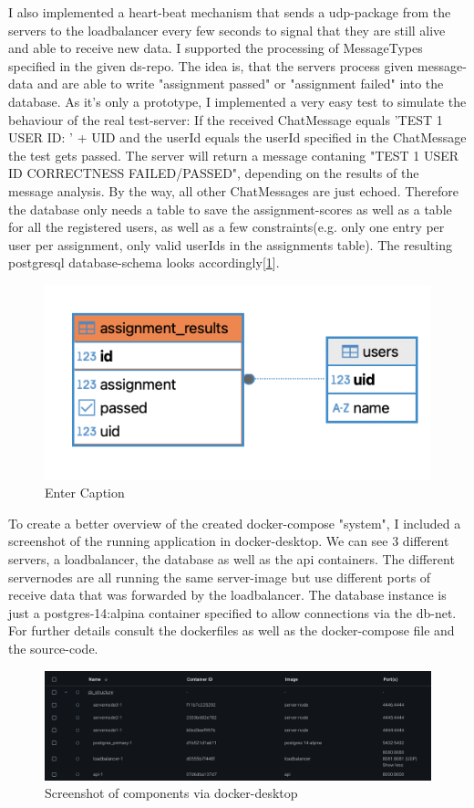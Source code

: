 \documentclass{article}
\begin{document}
I also implemented  a heart-beat mechanism that sends a udp-package from the servers to the loadbalancer every few seconds to signal that they are still alive and able to receive new data. 
I supported the processing of MessageTypes specified in the given ds-repo. 
The idea is, that the servers process given message-data and are able to write "assignment passed" or "assignment failed" into the database.
As it's only a prototype, I implemented a very easy test to simulate the behaviour of the real test-server:
If the received ChatMessage equals 'TEST 1 USER ID: ' + UID and the userId equals the userId specified in the ChatMessage the test gets passed. The server will return a message contaning "TEST 1 USER ID CORRECTNESS FAILED/PASSED", depending on the results of the message analysis. By the way, all other ChatMessages are just echoed.
Therefore the database only needs a table to save the assignment-scores as well as a table for all the registered users, as well as a few constraints(e.g. only one entry per user per assignment, only valid userIds in the assignments table).
The resulting postgresql database-schema looks accordingly[\ref{fig:database_assignment}].

\begin{figure}[!hb]
    \centering
    \includegraphics[width=0.5\linewidth]{images/database_screenshot.png}
    \caption{Enter Caption}
    \label{fig:database_assignment}
\end{figure}


To create a better overview of the created docker-compose "system", I included a screenshot of the running application in docker-desktop. We can see 3 different servers, a loadbalancer, the database as well as the api containers. The different servernodes are all running the same server-image but use different ports of receive data that was forwarded by the loadbalancer.
The database instance is just a postgres-14:alpina container specified to allow connections via the db-net. For further details consult the dockerfiles as well as the docker-compose file and the source-code.

\begin{figure}[!hb]
    \centering
    \includegraphics[width=1\linewidth]{images/docker_compose_screenshot.png}
    \caption{Screenshot of components via docker-desktop}
    \label{fig:docker_compose}
\end{figure}
\end{document}
